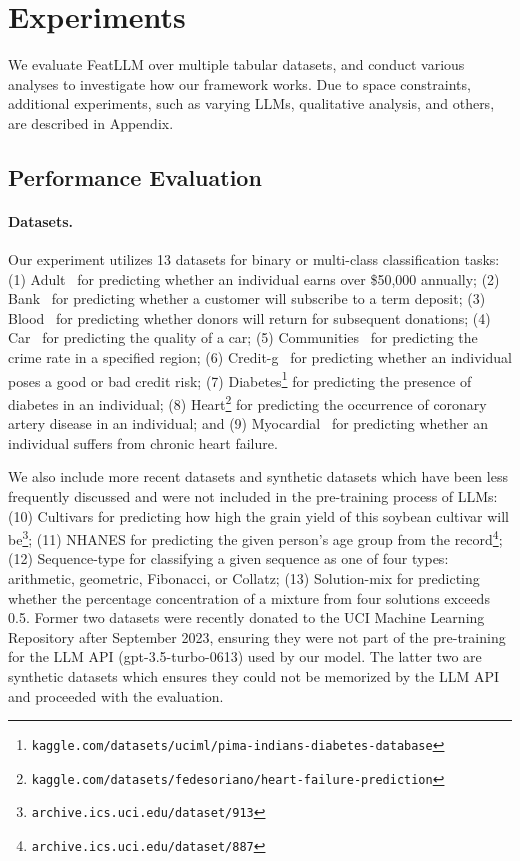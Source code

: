 \section{Experiments}
We evaluate \textsf{FeatLLM} over multiple tabular datasets, and conduct various analyses to investigate how our framework works. Due to space constraints, additional experiments, such as varying LLMs, qualitative analysis, and others, are described in Appendix. 

\subsection{Performance Evaluation}
\paragraph{Datasets.}
Our experiment utilizes 13 datasets for binary or multi-class classification tasks: (1) Adult~\cite{asuncion2007uci} for predicting whether an individual earns over \$50,000 annually; (2) Bank~\cite{moro2014data} for predicting whether a customer will subscribe to a term deposit; (3) Blood~\cite{yeh2009knowledge} for predicting whether donors will return for subsequent donations; (4) Car~\cite{kadra2021well} for predicting the quality of a car; (5) Communities~\cite{misc_communities_and_crime_183} for predicting the crime rate in a specified region; (6) Credit-g~\cite{kadra2021well} for predicting whether an individual poses a good or bad credit risk; (7) Diabetes\footnote{\texttt{kaggle.com/datasets/uciml/pima-indians-diabetes-database}} for predicting the presence of diabetes in an individual; (8) Heart\footnote{\texttt{kaggle.com/datasets/fedesoriano/heart-failure-prediction}} for predicting the occurrence of coronary artery disease in an individual; and (9) Myocardial~\cite{misc_myocardial_infarction_complications_579} for predicting whether an individual suffers from chronic heart failure. 

We also include more recent datasets and synthetic datasets which have been less frequently discussed and were not included in the pre-training process of LLMs: (10) Cultivars for predicting how high the grain yield of this soybean cultivar will be\footnote{\texttt{archive.ics.uci.edu/dataset/913}}; (11) NHANES for predicting the given person's age group from the record\footnote{\texttt{archive.ics.uci.edu/dataset/887}}; (12) Sequence-type for classifying a given sequence as one of four types: arithmetic, geometric, Fibonacci, or Collatz; (13) Solution-mix for predicting whether the percentage concentration of a mixture from four solutions exceeds 0.5. Former two datasets were recently donated to the UCI Machine Learning Repository after September 2023, ensuring they were not part of the pre-training for the LLM API (gpt-3.5-turbo-0613) used by our model. The latter two are synthetic datasets which ensures they could not be memorized by the LLM API and proceeded with the evaluation.

